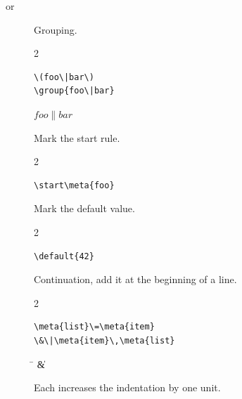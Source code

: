 \documentclass{scrartcl}
\begin{document}
{\begin{definition}
\begin{description}
\item[ or ]
Grouping.
\begin{multicols}{2}
\begin{verbatim}
\(foo\|bar\)
\group{foo\|bar}
\end{verbatim}
\columnbreak
\begin{metasyntax}
\(foo\|bar\)
\end{metasyntax}
\end{multicols}

\item[\code{\\start}]
Mark the start rule.
\begin{multicols}{2}
\begin{verbatim}
\start\meta{foo}
\end{verbatim}
\columnbreak
\begin{metasyntax}
\start{}
\end{metasyntax}
\end{multicols}

\item[]
Mark the default value.
\begin{multicols}{2}
\begin{verbatim}
\default{42}
\end{verbatim}
\columnbreak
\begin{metasyntax}
\end{metasyntax}
\end{multicols}

\item[\code{\\\&}]
\symindex{\&}
Continuation, add it at the beginning of a line.
\begin{multicols}{2}
\begin{verbatim}
\meta{list}\=\meta{item}
\&\|\meta{item}\,\meta{list}
\end{verbatim}
\columnbreak
\begin{metasyntax}
\=
\&\|\,
\end{metasyntax}
\end{multicols}
Each \symb{\&} increases the indentation by one unit.


\end{description}
\end{definition}}
\end{document}
